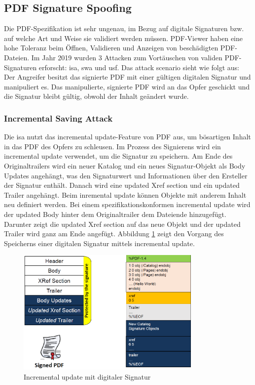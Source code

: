 \subsection{PDF Signature Spoofing}
Die PDF-Spezifikation ist sehr ungenau, im Bezug auf digitale Signaturen bzw. auf welche Art und Weise sie validiert werden müssen. PDF-Viewer haben eine hohe Toleranz beim Öffnen, Validieren und Anzeigen von beschädigten PDF-Dateien. Im Jahr 2019 wurden 3 Attacken zum Vortäuschen von validen PDF-Signaturen erforscht: \gls{isa}, \gls{swa} und \gls{usf}. Das attack scenario sieht wie folgt aus: Der Angreifer besitzt das signierte PDF mit einer gültigen digitalen Signatur und manipuliert es. Das manipulierte, signierte PDF wird an das Opfer geschickt und die Signatur bleibt gültig, obwohl der Inhalt geändert wurde. 

\subsubsection{Incremental Saving Attack}
Die \gls{isa} nutzt das incremental update-Feature von PDF aus, um bösartigen Inhalt in das PDF des Opfers zu schleusen. Im Prozess des Signierens wird ein incremental update verwendet, um die Signatur zu speichern. Am Ende des Originaltrailers wird ein neuer Katalog und ein neues Signatur-Objekt als Body Updates angehängt, was den Signaturwert und Informationen über den Ersteller der Signatur enthält. Danach wird eine updated Xref section und ein updated Trailer angehängt. Beim inremental update können Objekte mit anderem Inhalt neu definiert werden. Bei einem spezifikationskonformen incremental update wird der updated Body hinter dem Originaltrailer dem Dateiende hinzugefügt. Darunter zeigt die updated Xref section auf das neue Objekt und der updated Trailer wird ganz am Ende angefügt. Abbildung \ref{fig:incr-update} zeigt den Vorgang des Speicherns einer digitalen Signatur mittels incremental update.

\begin{figure}[!htbp]
	\centering
	\includegraphics[width=0.8\textwidth]{"images/dig_sig_incr_up.png"}
	\caption{Incremental update mit digitaler Signatur \cite{ccc-break-pdf-slides}}
	\label{fig:incr-update}
\end{figure}

